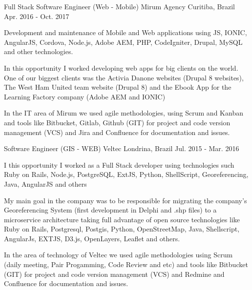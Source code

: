 \begin{cventries}
{\begin{cvitems}
      \end{cvitems}
    }
  \cventry
    {Full Stack Software Engineer (Web - Mobile)} %
    {Mirum Agency} %
    {Curitiba, Brazil} %
    {Apr. 2016 - Oct. 2017} %
    {
      \begin{cvitems} %
        \item {Development and maintenance of Mobile and Web applications using JS, IONIC, AngularJS, Cordova, Node.js, Adobe AEM, PHP, CodeIgniter, Drupal, MySQL and other technologies.}
        \item {In this opportunity I worked developing web apps for big clients on the world. One of our biggest clients was the Activia Danone websites (Drupal 8 websites), The West Ham United team website (Drupal 8) and the Ebook App for the Learning Factory company (Adobe AEM and IONIC) }
\item {In the IT area of Mirum we used agile methodologies, using Scrum and Kanban and tools like Bitbucket, Gitlab, Github (GIT) for project and code version management (VCS) and Jira and Confluence for documentation and issues.}
\end{cvitems}
    }

  \cventry
    {Software Engineer (GIS - WEB)} %
    {Veltec} %
    {Londrina, Brazil} %
    {Jul. 2015 - Mar. 2016} %
    {
      \begin{cvitems} %
        \item { I this opportunity I worked as a Full Stack developer using technologies such Ruby on Rails, Node.js, PostgreSQL, ExtJS, Python, ShellScript, Georeferencing, Java, AngularJS and others}
\item {My main goal in the company was to be responsible for migrating the company's Georeferencing System (first development in Delphi and .shp files) to a microservice architecture taking full advantage of open source technologies like Ruby on Rails, Postgresql, Postgis, Python, OpenStreetMap, Java, Shellscript, AngularJs, EXTJS, D3.js, OpenLayers, Leaflet and others.}
\item {In the area of technology of Veltec we used agile methodologies using Scrum (daily meeting, Pair Progamming, Code Review and etc) and tools like Bitbucket (GIT) for project and code version management (VCS) and Redmine and Confluence for documentation and issues.}
      \end{cvitems}
    }


\end{cventries}
